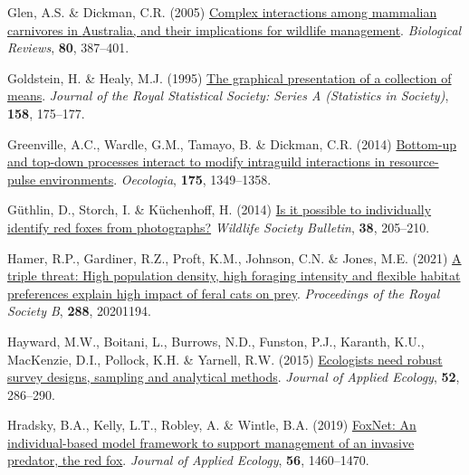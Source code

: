 \documentclass[preprint, 3p, authoryear]{elsarticle} %
\newlength{\cslhangindent}
\newlength{\cslentryspacingunit} %
\newenvironment{CSLReferences}[2] %
 {%
  \setlength{\parindent}{0pt}
  \ifodd #1
  \let\oldpar\par
  \def\par{\hangindent=\cslhangindent\oldpar}
  \fi
  \setlength{\parskip}{#2\cslentryspacingunit}
 }%
 {}
\begin{document}
\begin{CSLReferences}{1}{0}
\leavevmode{}%
Glen, A.S. \& Dickman, C.R. (2005) \href{https://doi.org/10.1017/S1464793105006718}{Complex interactions among mammalian carnivores in {{A}ustralia}, and their implications for wildlife management}. \emph{Biological Reviews}, \textbf{80}, 387--401.

\leavevmode{}%
Goldstein, H. \& Healy, M.J. (1995) \href{https://doi.org/10.2307/2983411}{The graphical presentation of a collection of means}. \emph{Journal of the Royal Statistical Society: Series A (Statistics in Society)}, \textbf{158}, 175--177.

\leavevmode{}%
Greenville, A.C., Wardle, G.M., Tamayo, B. \& Dickman, C.R. (2014) \href{https://doi.org/10.1007/s00442-014-2977-8}{Bottom-up and top-down processes interact to modify intraguild interactions in resource-pulse environments}. \emph{Oecologia}, \textbf{175}, 1349--1358.

\leavevmode{}%
Güthlin, D., Storch, I. \& Küchenhoff, H. (2014) \href{https://doi.org/10.1002/wsb.377}{Is it possible to individually identify red foxes from photographs?} \emph{Wildlife Society Bulletin}, \textbf{38}, 205--210.

\leavevmode{}%
Hamer, R.P., Gardiner, R.Z., Proft, K.M., Johnson, C.N. \& Jones, M.E. (2021) \href{https://doi.org/10.1098/rspb.2020.1194}{A triple threat: High population density, high foraging intensity and flexible habitat preferences explain high impact of feral cats on prey}. \emph{Proceedings of the Royal Society B}, \textbf{288}, 20201194.

\leavevmode{}%
Hayward, M.W., Boitani, L., Burrows, N.D., Funston, P.J., Karanth, K.U., MacKenzie, D.I., Pollock, K.H. \& Yarnell, R.W. (2015) \href{https://doi.org/10.1111/1365-2664.12408}{Ecologists need robust survey designs, sampling and analytical methods}. \emph{Journal of Applied Ecology}, \textbf{52}, 286--290.

\leavevmode{}%
Hradsky, B.A., Kelly, L.T., Robley, A. \& Wintle, B.A. (2019) \href{https://doi.org/10.1111/1365-2664.13374}{FoxNet: An individual-based model framework to support management of an invasive predator, the red fox}. \emph{Journal of Applied Ecology}, \textbf{56}, 1460--1470.


\end{CSLReferences}
\end{document}
